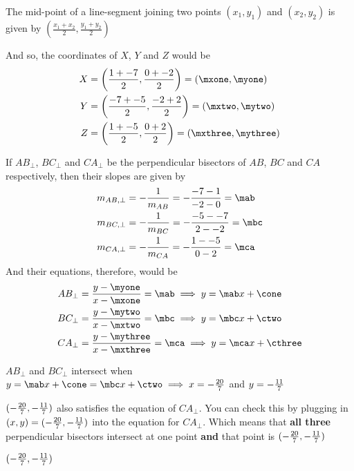 \vspace{0.5cm}
\centerline{\box\figBoxA}

\watchout

\begin{solution}[\fullpage]
	
		The mid-point of a line-segment joining two points $(x_1, y_1)$ and $(x_2, y_2)$ is given 
		by $\left( \frac{x_1 + x_2}{2}, \frac{y_1 + y_2}{2}\right)$
		
		And so, the coordinates of $X$, $Y$ and $Z$ would be 
		\begin{align}
			X &= \left( \frac{\va + \vc}{2}, \frac{\vb + \vd}{2} \right) = (\mxone, \myone) \\
			Y &= \left( \frac{\vc + \ve}{2}, \frac{\vd + \vf}{2} \right) = (\mxtwo, \mytwo) \\
			Z &= \left( \frac{\va + \ve}{2}, \frac{\vb + \vf}{2} \right) = (\mxthree, \mythree)
		\end{align}
	
		If $AB_\perp$, $BC_\perp$ and $CA_\perp$ be the perpendicular bisectors of $AB$, $BC$ and $CA$ respectively, then 
		their slopes are given by
		\begin{align}
			m_{AB,\perp} &= -\frac{1}{m_{AB}} = -\dfrac{\vc - \va}{\vd - \vb} = \mab \\
			m_{BC,\perp} &= -\frac{1}{m_{BC}} = -\dfrac{\ve - \vc}{\vf - \vd} = \mbc \\
			m_{CA,\perp} &= -\frac{1}{m_{CA}} = -\dfrac{\va - \ve}{\vb - \vf} = \mca
		\end{align}
		And their equations, therefore, would be 
		\begin{align}
			AB_\perp &= \dfrac{y-\myone}{x-\mxone} = \mab \implies y = \mab x + \cone \\
			BC_\perp &= \dfrac{y-\mytwo}{x-\mxtwo} = \mbc \implies y = \mbc x + \ctwo \\
			CA_\perp &= \dfrac{y-\mythree}{x-\mxthree} = \mca \implies y = \mca x + \cthree					
		\end{align}
	
		$AB_\perp$ and $BC_\perp$ intersect when $ y = \mab x + \cone = \mbc x + \ctwo \implies x = \vg$ 
		and $y = -\frac{11}{7}$
		
		$(-\frac{20}{7}, -\frac{11}{7})$ also satisfies the equation of $CA_\perp$. You can check this by plugging in 
		$(x,y) = (-\frac{20}{7}, -\frac{11}{7})$ into the equation for $CA_\perp$. Which means that \textbf{all three} 
		perpendicular bisectors intersect at one point \textbf{and} that point is $(-\frac{20}{7}, -\frac{11}{7})$
\end{solution}

\ifprintanswers\begin{codex}$(-\frac{20}{7}, -\frac{11}{7})$\end{codex}\fi

